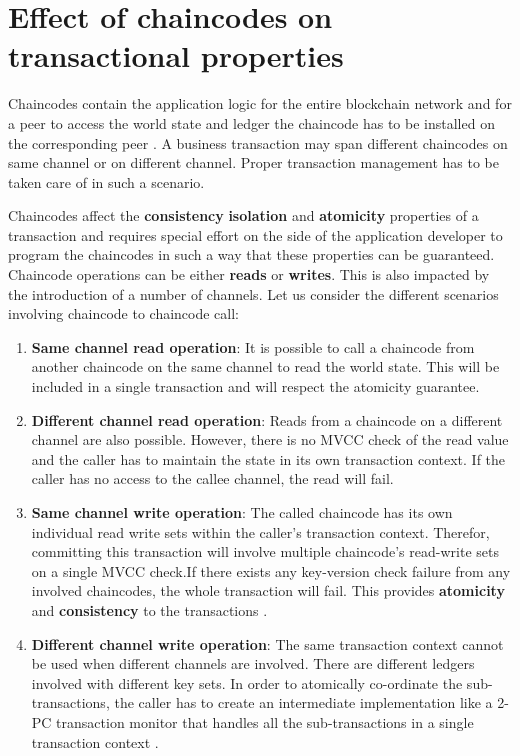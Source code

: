 \documentclass[
  a4paper,  %
  twoside,  %
  bibliography=totoc,
  headsepline,
  cleardoublepage=empty,
  parskip=half,
  draft=false
]{scrbook}
\begin{document}
\section{Effect of chaincodes on transactional properties}
Chaincodes contain the application logic for the entire blockchain network and for a peer to access the world state and ledger the chaincode has to be installed on the corresponding peer \cite{Chaincode}. A business transaction may span different chaincodes on same channel or on different channel. Proper transaction management has to be taken care of in such a scenario.

Chaincodes affect the \textbf{consistency} \textbf{isolation} and \textbf{atomicity} properties of a transaction and requires special effort on the side of the application developer to program the chaincodes in such a way that these properties can be guaranteed. Chaincode operations can be either \textbf{reads} or \textbf{writes}. This is also impacted by the introduction of a number of channels. Let us consider the different scenarios involving chaincode to chaincode call:
\begin{enumerate}
    \item \textbf{Same channel read operation}: It is possible to call a chaincode from another chaincode on the same channel to read the world state. This will be included in a single transaction and will respect the atomicity guarantee.
    \item \textbf{Different channel read operation}: Reads from a chaincode on a different channel are also possible. However, there is no MVCC check of the read value and the caller has to maintain the state in its own transaction context. If the caller has no access to the callee channel, the read will fail.
    \item \textbf{Same channel write operation}: The called chaincode has its own individual read write sets within the caller's transaction context. Therefor, committing this transaction will involve multiple chaincode's read-write sets on a single MVCC check.If there exists any key-version check failure from any involved chaincodes, the whole transaction will fail. This provides \textbf{atomicity} and \textbf{consistency} to the transactions \cite{jira}.
    \item \textbf{Different channel write operation}: The same transaction context cannot be used when different channels are involved. There are different ledgers involved with different key sets. In order to atomically co-ordinate the sub-transactions, the caller has to create an intermediate implementation like a 2-PC transaction monitor that handles all the sub-transactions in a single transaction context \cite{jira}.
\end{enumerate}
\end{document}
